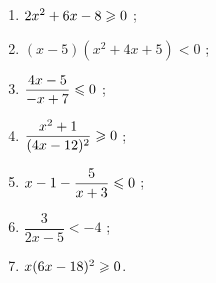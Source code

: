 \documentclass[a4paper,11pt]{article}
\begin{document}
\begin{enumerate}
	\item $2x^2+6x-8 \geqslant 0$ ;					\hfill{}
	\item $(x-5)(x^2+4x+5) < 0$ ;				\hfill{}
	\item $\dfrac{4x-5}{-x+7} \leqslant 0$ ;			\hfill{}
	\item $\dfrac{x^2+1}{(4x-12)^2} \geqslant 0$ ;	\hfill{}
	\item $ x -1 - \dfrac{5}{x+3} \leqslant 0$ ;		\hfill{}
	\item $\dfrac{3}{2x-5} < -4$ ;			\hfill{}
	\item $x(6x-18)^2 \geqslant 0$.						\hfill{}
\end{enumerate}
\end{document}
